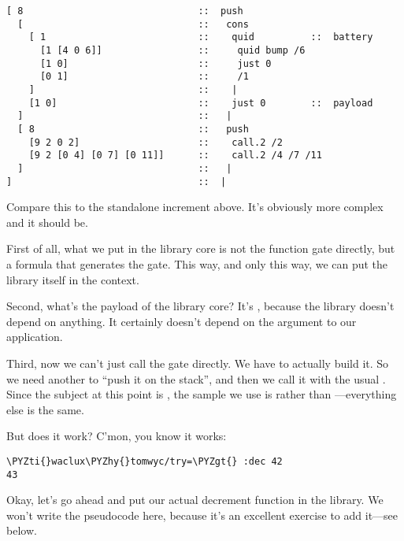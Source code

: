 \begin{framed_shaded}
\begin{Verbatim}[fontsize=\relsize{-2.5},fontseries=b,commandchars=\\\{\}]
[ 8                               ::  push
  [                               ::   cons
    [ 1                           ::    quid          ::  battery
      [1 [4 0 6]]                 ::     quid bump /6
      [1 0]                       ::     just 0
      [0 1]                       ::     /1
    ]                             ::    |
    [1 0]                         ::    just 0        ::  payload
  ]                               ::   |
  [ 8                             ::   push
    [9 2 0 2]                     ::    call.2 /2
    [9 2 [0 4] [0 7] [0 11]]      ::    call.2 /4 /7 /11
  ]                               ::   |
]                                 ::  |
\end{Verbatim}
\end{framed_shaded}

Compare this to the standalone increment above.  It's obviously
more complex and it should be.

First of all, what we put in the library core is not the function
gate directly, but a formula that generates the gate.  This way,
and only this way, we can put the library itself in the context.

Second, what's the payload of the library core?  It's ,
because the library doesn't depend on anything.  It certainly
doesn't depend on the argument to our application.

Third, now we can't just call the gate directly.  We have to
actually build it.  So we need another  to ``push it on the
stack'', and then we call it with the usual .  Since the
subject at this point is , the sample we
use is \kode{[0 7]} rather than \kode{[0 3]}---everything else is the same.

But does it work?  C'mon, you know it works:

\begin{framed_shaded}
\begin{Verbatim}[fontsize=\relsize{-2.5},fontseries=b,commandchars=\\\{\}]
\PYZti{}waclux\PYZhy{}tomwyc/try=\PYZgt{} :dec 42
43
\end{Verbatim}
\end{framed_shaded}

Okay, let's go ahead and put our actual decrement function in
the library.  We won't write the pseudocode here, because it's an
excellent exercise to add it---see below.

